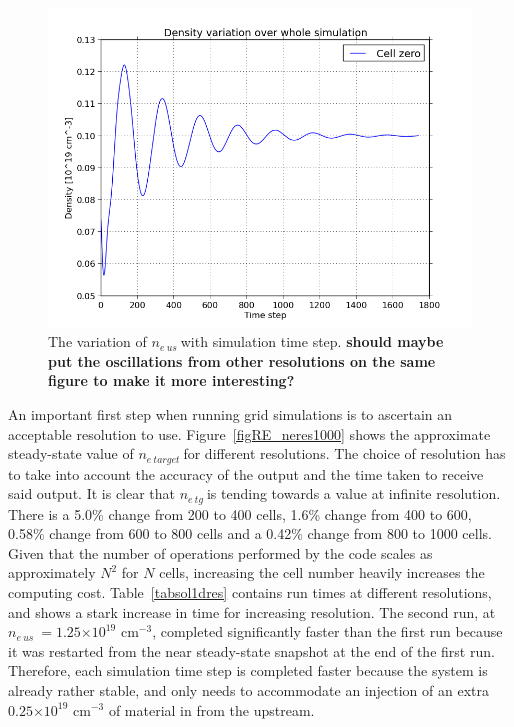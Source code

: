\documentclass[11pt]{article}  %
\providecommand{\e}[1]{\ensuremath{\times 10^{#1}}} %
\providecommand{\neus}{$n_{e~us}~$} %
\providecommand{\netarget}{$n_{e~target}~$} %
\providecommand{\netg}{$n_{e~tg}~$} %
\begin{document}
\begin{figure}
\includegraphics[scale=0.4]{Figures/sol1d/ne_var_ny=800.png}
\centering
\caption{The variation of \neus with simulation time step. \textbf{should maybe put the oscillations from other resolutions on the same figure to make it more interesting?}}\label{figne_var_ny=800}
\end{figure}

An important first step when running grid simulations is to ascertain an acceptable resolution to use. Figure~\ref{figRE_neres1000} shows the approximate steady-state value of \netarget for different resolutions. The choice of resolution has to take into account the accuracy of the output and the time taken to receive said output. It is clear that \netg is tending towards a value at infinite resolution. There is a 5.0\% change from 200 to 400 cells, 1.6\% change from 400 to 600, 0.58\% change from 600 to 800 cells and a 0.42\% change from 800 to 1000 cells. Given that the number of operations performed by the code scales as approximately $N^2$ for $N$ cells, increasing the cell number heavily increases the computing cost. Table~\ref{tabsol1dres} contains run times at different resolutions, and shows a stark increase in time for increasing resolution. The second run, at \neus $= 1.25\e{19}$ cm$^{-3}$, completed significantly faster than the first run because it was restarted from the near steady-state snapshot at the end of the first run. Therefore, each simulation time step is completed faster because the system is already rather stable, and only needs to accommodate an injection of an extra $0.25\e{19}$ cm$^{-3}$ of material in from the upstream.
\end{document}
